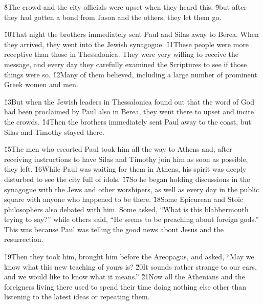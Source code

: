 \v{8}The crowd and the city officials were upset when they heard this, \v{9}but after they had gotten a bond from Jason and the others, they let them go.

\v{10}That night the brothers immediately sent Paul and Silas away to Berea. When they arrived, they went into the Jewish synagogue. \v{11}These people were more receptive than those in Thessalonica. They were very willing to receive the message, and every day they carefully examined the Scriptures to see if those things were so. \v{12}Many of them believed, including a large number of prominent Greek women and men.

\v{13}But when the Jewish leaders in Thessalonica found out that the word of God had been proclaimed by Paul also in Berea, they went there to upset and incite the crowds. \v{14}Then the brothers immediately sent Paul away to the coast, but Silas and Timothy stayed there.

\v{15}The men who escorted Paul took him all the way to Athens and, after receiving instructions to have Silas and Timothy join him as soon as possible, they left. \v{16}While Paul was waiting for them in Athens, his spirit was deeply disturbed to see the city full of idols. \v{17}So he began holding discussions in the synagogue with the Jews and other worshipers, as well as every day in the public square with anyone who happened to be there. \v{18}Some Epicurean and Stoic philosophers also debated with him. Some asked, ``What is this blabbermouth trying to say?'' while others said, ``He seems to be preaching about foreign gods.'' This was because Paul was telling the good news about Jesus and the resurrection.

\v{19}Then they took him, brought him before the Areopagus, and asked, ``May we know what this new teaching of yours is? \v{20}It sounds rather strange to our ears, and we would like to know what it means.'' \v{21}Now all the Athenians and the foreigners living there used to spend their time doing nothing else other than listening to the latest ideas or repeating them.

